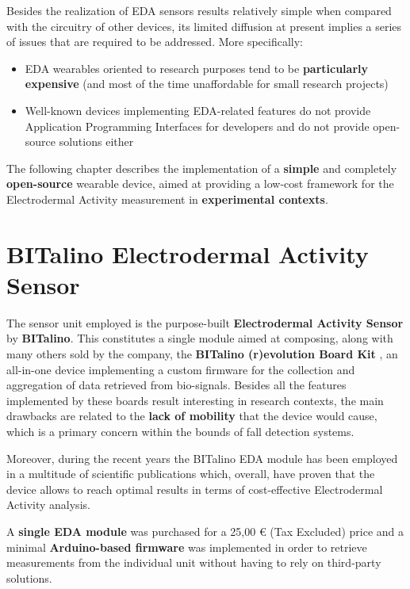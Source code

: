 \label{ch:implementation}

Besides the realization of EDA sensors results relatively simple when compared with the circuitry of other devices, its limited diffusion at present implies a series of issues that are required to be addressed. More specifically:

\begin{itemize}
    \item EDA wearables oriented to research purposes tend to be \textbf{particularly expensive} (and most of the time unaffordable for small research projects)
    \item Well-known devices implementing EDA-related features do not provide Application Programming Interfaces for developers and do not provide open-source solutions either
\end{itemize}

The following chapter describes the implementation of a \textbf{simple} and completely \textbf{open-source} wearable device, aimed at providing a low-cost framework for the Electrodermal Activity measurement in \textbf{experimental contexts}.

\section{BITalino Electrodermal Activity Sensor}\label{sec:bitalino}

The sensor unit employed is the purpose-built \textbf{Electrodermal Activity Sensor} by \textbf{BITalino}. This constitutes a single module aimed at composing, along with many others sold by the company, the \textbf{BITalino (r)evolution Board Kit} \cite{bitalino-general}, an all-in-one device implementing a custom firmware for the collection and aggregation of data retrieved from bio-signals. Besides all the features implemented by these boards result interesting in research contexts, the main drawbacks are related to the \textbf{lack of mobility} that the device would cause, which is a primary concern within the bounds of fall detection systems.

Moreover, during the recent years the BITalino EDA module has been employed in a multitude of scientific publications which, overall, have proven that the device allows to reach optimal results in terms of cost-effective Electrodermal Activity analysis.

A \textbf{single EDA module} was purchased for a 25,00 € (Tax Excluded) price and a minimal \textbf{Arduino-based firmware} was implemented in order to retrieve measurements from the individual unit without having to rely on third-party solutions.

